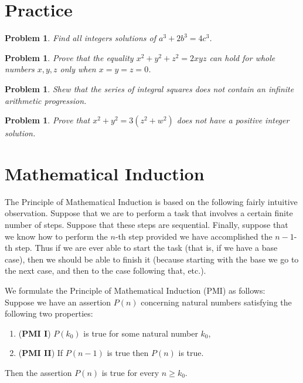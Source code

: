 \documentclass[11pt, openany]{book}
\theoremstyle{change} \theoremheaderfont{\blue\sffamily\bfseries}
\newtheorem{pro}[thm]{Problem}
\theoremstyle{nonumberplain} \theoremheaderfont{\sffamily\bfseries}
\newcommand{\í}{\'{\i}}
\begin{document}
\section*{Practice}\begin{multicols}{2}\columnseprule 1pt \columnsep 25pt
\begin{pro}
Find all integers solutions of $a^3 + 2b^3 = 4c^3$.
\end{pro}
\begin{pro}
Prove that the equality $x^2 + y^2 + z^2 = 2xyz$ can hold for
whole numbers $x, y, z$ only when $x = y = z = 0$.
\end{pro}
\begin{pro}
Shew that the series of integral squares does not contain an
infinite arithmetic progression.
\end{pro}
\begin{pro}
Prove that $x^2 + y^2 = 3(z^2 + w^2)$ does not have a positive
integer solution.
\end{pro}

\end{multicols}




\section{Mathematical Induction} The Principle of
Mathematical Induction is based on the following fairly intuitive
observation. Suppose that we are to perform a task that involves a
certain finite number of steps. Suppose that these steps are
sequential. Finally, suppose that we know how to perform the
$n$-th step provided we have accomplished the $n - 1$-th step.
Thus if we are ever able to start the task (that is, if we have a
base case), then we should be able to finish it (because starting
with the base we go to the next case, and then to the case
following that, etc.).

We formulate the Principle of Mathematical Induction (PMI) as follows: \\
 Suppose we
have an assertion $P(n)$ concerning natural numbers satisfying the
following two properties:
\begin{enumerate}
\item[] ({\bf PMI I}) $P(k_0)$ is true for some natural number
$k_0$, \item[] ({\bf PMI II}) If $P(n - 1)$ is true then $P(n)$ is
true.
\end{enumerate}
Then the assertion $P(n)$ is true for every $n \geq k_0.$
\end{document}
